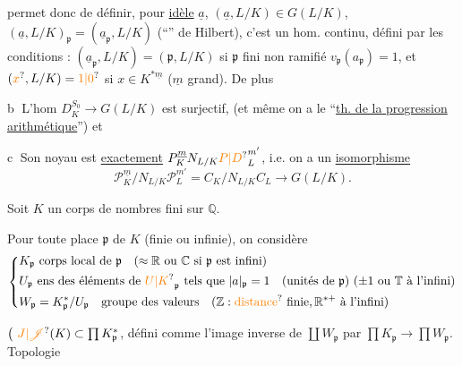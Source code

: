  permet donc de définir, pour  \uline{idèle} $\underline a$,  $(\underline a,L/K)\in G(L/K)$,  $(\underline a,L/K)_{\mathfrak p}=(\underline a_{\mathfrak p},L/K)$ (``'' de Hilbert), c'est un hom. continu, défini par les conditions : $(\underline a_{\mathfrak p},L/K)=(\mathfrak p,L/K)$ si $\mathfrak p$ fini non ramifié  $v_{\mathfrak p}(a_{\mathfrak p})=1$, et $(\unsure{x},L/K)=\unsure{1|0}$ si  $x\in K^{*\underline m}$ ($\underline m$ grand). De plus

\textcircled{b} L'hom $D_K^{S_0}\longrightarrow G(L/K)$ est surjectif, (et même on a le ``\uline{th. de la progression arithmétique}'') et

\textcircled{c} Son noyau est \uline{exactement} $P_K^{\underline m}N_{L/K}{\unsure{P|D}}_L^{m'}$, i.e. on a un \uline{isomorphisme}
\[
\mathscr{P}_K^{\underline m}/N_{L/K}\mathscr{P}_L^{m'}=C_K/N_{L/K}C_L\longrightarrow G(L/K).
\]

Soit $K$ un corps de nombres fini sur $\mathbb Q$.

Pour toute place $\mathfrak p$ de $K$ (finie ou infinie), on considère
\[
\left\{\begin{aligned}
&K_{\mathfrak p}\ \text{corps local de }\mathfrak p\quad(\approx\mathbb R\text{ ou }\mathbb C\text{ si }\mathfrak p\text{ est infini})\\
&U_{\mathfrak p}\ \text{ens des éléments de }{\unsure{U|K}}_{\mathfrak p}\text{ tels que }|a|_{\mathfrak p}=1\quad(\text{unités de }\mathfrak p)\ (\pm1\text{ ou }\mathbb T\text{ à l'infini})\\
&W_{\mathfrak p}=K_{\mathfrak p}^*/U_{\mathfrak p}\quad\text{groupe des valeurs}\quad(\mathbb Z:\text{\unsure{distance} finie},\mathbb R^{*+}\text{ à l'infini})
\end{aligned}\right.
\]

$\bigl(\ \unsure{J|\mathscr{J}}(K)\subset\prod K_{\mathfrak p}^*$, défini comme l'image inverse de $\coprod W_{\mathfrak p}$ par $\prod K_{\mathfrak p}\longrightarrow\prod W_{\mathfrak p}$. Topologie

